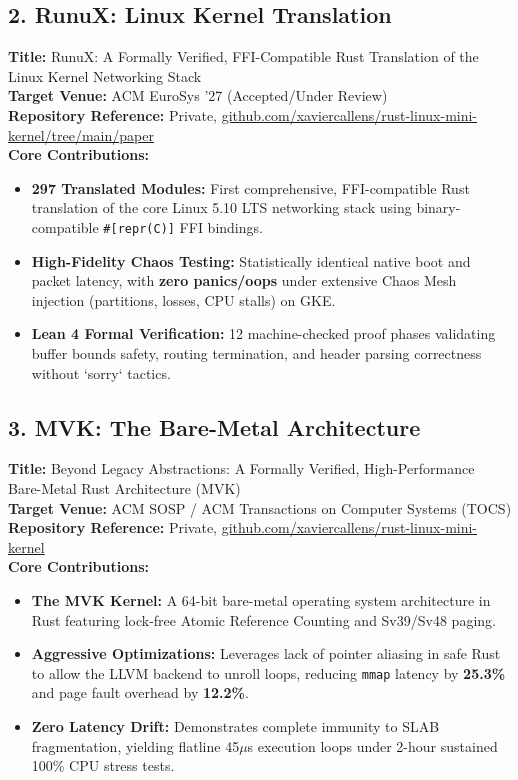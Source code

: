 \documentclass[11pt,a4paper]{article}
\begin{document}
\subsection{2. RunuX: Linux Kernel Translation}
\textbf{Title:} RunuX: A Formally Verified, FFI-Compatible Rust Translation of the Linux Kernel Networking Stack \\
\textbf{Target Venue:} ACM EuroSys '27 (Accepted/Under Review) \\
\textbf{Repository Reference:} Private, \url{github.com/xaviercallens/rust-linux-mini-kernel/tree/main/paper} \\
\textbf{Core Contributions:}
\begin{itemize}
    \item \textbf{297 Translated Modules:} First comprehensive, FFI-compatible Rust translation of the core Linux 5.10 LTS networking stack using binary-compatible \texttt{\#[repr(C)]} FFI bindings.
    \item \textbf{High-Fidelity Chaos Testing:} Statistically identical native boot and packet latency, with \textbf{zero panics/oops} under extensive Chaos Mesh injection (partitions, losses, CPU stalls) on GKE.
    \item \textbf{Lean 4 Formal Verification:} 12 machine-checked proof phases validating buffer bounds safety, routing termination, and header parsing correctness without `sorry` tactics.
\end{itemize}

\subsection{3. MVK: The Bare-Metal Architecture}
\textbf{Title:} Beyond Legacy Abstractions: A Formally Verified, High-Performance Bare-Metal Rust Architecture (MVK) \\
\textbf{Target Venue:} ACM SOSP / ACM Transactions on Computer Systems (TOCS) \\
\textbf{Repository Reference:} Private, \url{github.com/xaviercallens/rust-linux-mini-kernel} \\
\textbf{Core Contributions:}
\begin{itemize}
    \item \textbf{The MVK Kernel:} A 64-bit bare-metal operating system architecture in Rust featuring lock-free Atomic Reference Counting and Sv39/Sv48 paging.
    \item \textbf{Aggressive Optimizations:} Leverages lack of pointer aliasing in safe Rust to allow the LLVM backend to unroll loops, reducing \texttt{mmap} latency by \textbf{25.3\%} and page fault overhead by \textbf{12.2\%}.
    \item \textbf{Zero Latency Drift:} Demonstrates complete immunity to SLAB fragmentation, yielding flatline 45$\mu$s execution loops under 2-hour sustained 100\% CPU stress tests.
\end{itemize}
\end{document}
